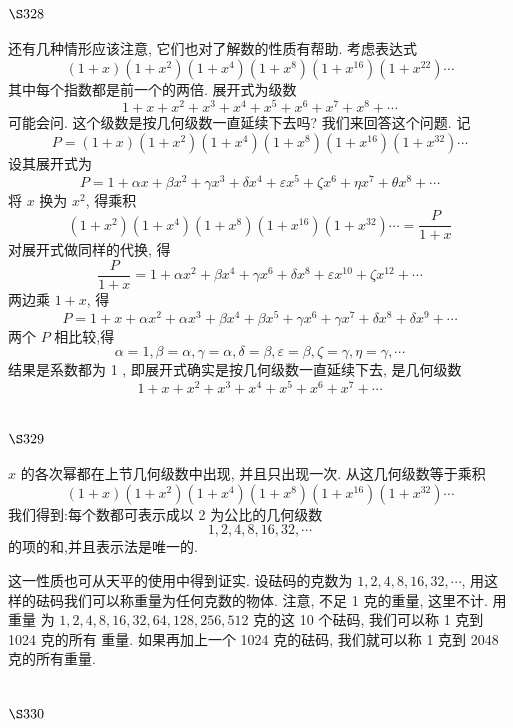 \section{$\S 328$}

还有几种情形应该注意, 它们也对了解数的性质有帮助. 考虑表达式 
\[(1+x)(1+x^2)(1+x^4)(1+x^8)(1+x^16)(1+x^22)\cdots\]
其中每个指数都是前一个的两倍. 展开式为级数
\[
1+x+x^{2}+x^{3}+x^{4}+x^{5}+x^{6}+x^{7}+x^{8}+\cdots
\]
可能会问. 这个级数是按几何级数一直延续下去吗? 我们来回答这个问题. 记
\[
P=(1+x)\left(1+x^{2}\right)\left(1+x^{4}\right)\left(1+x^{8}\right)\left(1+x^{16}\right)\left(1+x^{32}\right) \cdots
\]
设其展开式为
\[
P=1+\alpha x+\beta x^{2}+\gamma x^{3}+\delta x^{4}+\varepsilon x^{5}+\zeta x^{6}+\eta x^{7}+\theta x^{8}+\cdots
\]
将 $x$ 换为 $x^{2}$, 得乘积
\[
\left(1+x^{2}\right)\left(1+x^{4}\right)\left(1+x^{8}\right)\left(1+x^{16}\right)\left(1+x^{32}\right) \cdots=\frac{P}{1+x}
\]
对展开式做同样的代换, 得
\[
\frac{P}{1+x}=1+\alpha x^{2}+\beta x^{4}+\gamma x^{6}+\delta x^{8}+\varepsilon x^{10}+\zeta x^{12}+\cdots
\]
两边乘 $1+x$, 得
\[
P=1+x+\alpha x^{2}+\alpha x^{3}+\beta x^{4}+\beta x^{5}+\gamma x^{6}+\gamma x^{7}+\delta x^{8}+\delta x^{9}+\cdots
\]
两个 $P$ 相比较,得
\[
\alpha=1, \beta=\alpha, \gamma=\alpha, \delta=\beta, \varepsilon=\beta, \zeta=\gamma, \eta=\gamma, \cdots
\]
结果是系数都为 1 , 即展开式确实是按几何级数一直延续下去, 是几何级数
\[
1+x+x^{2}+x^{3}+x^{4}+x^{5}+x^{6}+x^{7}+\cdots
\]
\section{$\S 329$}

$x$ 的各次幂都在上节几何级数中出现, 并且只出现一次. 从这几何级数等于乘积
\[
(1+x)\left(1+x^{2}\right)\left(1+x^{4}\right)\left(1+x^{8}\right)\left(1+x^{16}\right)\left(1+x^{32}\right) \cdots
\]
我们得到:每个数都可表示成以 2 为公比的几何级数
\[
1,2,4,8,16,32, \cdots
\]
的项的和,并且表示法是唯一的.

这一性质也可从天平的使用中得到证实. 设砝码的克数为 $1,2,4,8,16,32, \cdots$, 用这 样的砝码我们可以称重量为任何克数的物体. 注意, 不足 1 克的重量, 这里不计. 用重量 为 $1,2,4,8,16,32,64,128,256,512$ 克的这 10 个砝码, 我们可以称 1 克到 1024 克的所有 重量. 如果再加上一个 1024 克的砝码, 我们就可以称 1 克到 2048 克的所有重量.

\section{$\S 330$}

